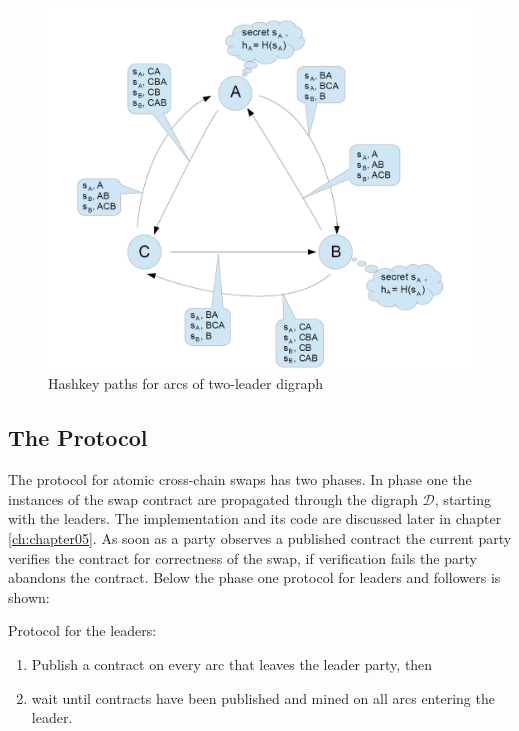\begin{figure}[h]
	\includegraphics[width=0.6\paperwidth]{hashkey_paths}	%
	\caption{Hashkey paths for arcs of two-leader digraph}
	\label{fig:hashkey_paths}
\end{figure}

\subsection{The Protocol}
\label{subsec:background:second_section:protocol}
The protocol for atomic cross-chain swaps has two phases. In phase one the instances of the swap contract are propagated through the digraph $\mathcal{D}$, starting with the leaders. The implementation and its code are discussed later in chapter \ref{ch:chapter05}. As soon as a party observes a published contract the current party verifies the contract for correctness of the swap, if verification fails the party abandons the contract. Below the phase one protocol for leaders and followers is shown: \newline

Protocol for the leaders:
\begin{enumerate}
	\item Publish a contract on every arc that leaves the leader party, then
	\item wait until contracts have been published and mined on all arcs entering the leader.
\end{enumerate}

